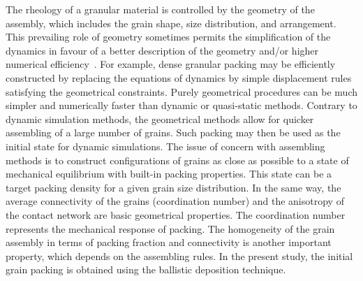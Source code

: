 The rheology of a granular material is controlled by the geometry of the 
assembly, which includes the grain shape, size distribution, and arrangement. 
This prevailing role of geometry sometimes permits the simplification of the 
dynamics in favour of a better description of the geometry 
and/or higher numerical efficiency~\citep{Radjai2011}. For example, dense 
granular packing may be efficiently constructed by replacing the equations of 
dynamics by simple displacement rules satisfying the geometrical constraints. 
Purely geometrical procedures can be much simpler and numerically faster than 
dynamic or quasi-static methods. Contrary to dynamic simulation methods, 
the geometrical methods allow for quicker assembling of a large number of 
grains. Such packing may then be used as the initial state for dynamic 
simulations. The issue of concern with assembling methods is to construct 
configurations of grains as close as possible to a state of mechanical 
equilibrium with built-in packing properties. This state can be a target 
packing density for a given grain size distribution. In the same way, the 
average connectivity of the 
grains (coordination number) and the anisotropy of the contact network are 
basic geometrical properties. The coordination number represents the mechanical 
response of packing. The homogeneity of the grain assembly in terms of 
packing fraction and connectivity is another important property, which depends 
on the assembling rules. In the present study, the initial grain packing is 
obtained using the ballistic deposition technique.

